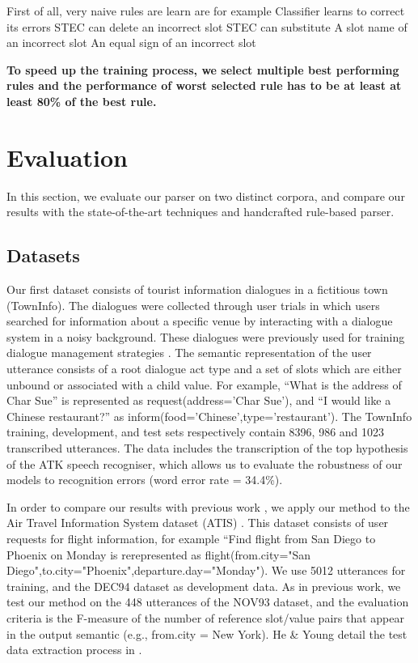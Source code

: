 \documentclass[11pt]{article}
\begin{document}
First of all, very naive rules are learn are for example 
Classifier learns to correct its errors
STEC can delete an incorrect slot
STEC can substitute
A slot name of an incorrect slot
An equal sign of an incorrect slot

\textbf{To speed up the training process, we select multiple best performing rules and the performance of worst selected rule has to be at least at least 80\% of the best rule.}



\section{Evaluation} \label{sec:evaluation}

In this section, we evaluate our parser on two distinct corpora, and compare our results with the state-of-the-art techniques and handcrafted rule-based parser. 

\subsection{Datasets}

Our first dataset consists of tourist information dialogues in a fictitious
town (TownInfo). The dialogues were collected through user
trials in which users searched for information about a specific venue
by interacting with a dialogue system in a noisy background. These
dialogues were previously used for training dialogue management
strategies \cite{williams07,thomson08}. The semantic representation of the user utterance consists of a root dialogue act type and a set of slots which are either
unbound or associated with a child value. For example, ``What is
the address of Char Sue'' is represented as request(address='Char Sue'), and ``I would like a Chinese restaurant?'' as inform(food='Chinese',type='restaurant'). The TownInfo training, development, and test sets respectively contain
8396, 986 and 1023 transcribed utterances.  The data includes the transcription of the top hypothesis of the ATK speech recogniser,
which allows us to evaluate the robustness of our models to recognition
errors (word error rate = 34.4\%). 

In order to compare our results with previous work \cite{he06,zettlemoyer07},
we apply our method to the Air Travel Information System dataset
(ATIS) \cite{atis94}. This dataset consists of user requests for flight information, for example ``Find flight from San Diego to Phoenix on Monday is rerepresented as flight(from.city="San Diego",to.city="Phoenix",departure.day="Monday"). We use 5012 utterances for training, and the DEC94 dataset as development data. As in previous work, we test our method on the 448 utterances of the NOV93 dataset, and the evaluation criteria is the F-measure of the number of reference slot/value pairs that appear in the output semantic (e.g., from.city = New York). He \& Young detail the test data extraction process in \cite{he05}.
\end{document}
